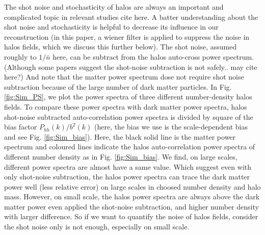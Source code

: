  The shot noise and stochasticity of halos are always an important and
  complicated topic in relevant studies {\color{blue} cite here}.
  A batter understanding about the shot noise and 
 stochasticity is helpful to decrease its influence in our reconstruction
 (in this paper, a wiener filter is applied to suppress the noise in halos
 fields, which we discuss this further below).
 The shot noise, assumed roughly to $1/\bar{n}$ here, can be subtract from
 the halos auto-cross power spectrum.
 {\color{blue} (Although some papers suggest the shot-noise subtraction is not safely.. may cite here?)} 
 And note that the matter power spectrum 
 dose not require shot noise subtraction because of the large number of 
 dark matter particles. In Fig. \ref{fig:Sim_PS}, we plot the power spectra
 of three different number-density halos fields. To compare these power
 spectra with dark matter power spectra, halos 
 shot-noise subtracted auto-correlation
 power spectra is divided by square of the bias factor 
   $P_{hh}(k)/b^2(k)$ (here, the bias we use is the scale-dependent bias and
   see Fig. \ref{fig:Sim_bias}). 
 Here, the black solid line is the matter power spectrum and coloured 
 lines indicate the halos auto-correlation power spectra of 
 different number density
 as in Fig. \ref{fig:Sim_bias}. We find, on large scales, different power
 spectra are almost have a same value. Which suggest 
  even with only shot-noise subtraction, the halos power spectra
 can trace the dark matter power well (less relative error) on large scales
 in choosed number density and halo mass. However, on 
 small scale, the halos power spectra are always above the dark matter power
 even applied the shot-noise subtraction, and higher number density with
 larger difference. So if we want to quantify the noise
 of halos fields, consider the
 shot noise only is not enough, especially on small scale.\\
 
